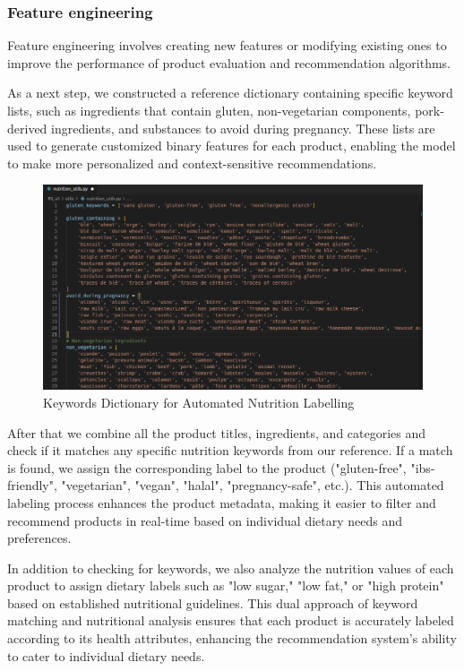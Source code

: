 \subsubsection{Feature engineering}
\par Feature engineering involves creating new features or modifying existing
ones to improve the performance of product evaluation and recommendation algorithms.

\par As a next step, we constructed a reference dictionary containing specific
keyword lists, such as ingredients that contain gluten, non-vegetarian
components, pork-derived ingredients, and substances to avoid during
pregnancy. These lists are used to generate customized binary features
for each product, enabling the model to make more personalized and
context-sensitive recommendations.

\begin{center}
\begin{figure}[H]
    \includegraphics[scale=0.45]{images/nutrition_utils.png}
    \caption{Keywords Dictionary for Automated Nutrition Labelling} 
    \label{fig:nutrition_utils_file}
\end{figure}
\end{center}

After that we combine all the product titles, ingredients, and categories and check if it matches any specific nutrition keywords from our reference. 
If a match is found, we assign the corresponding label to the product ("gluten-free", "ibs-friendly", "vegetarian", "vegan", "halal", "pregnancy-safe", etc.). 
This automated labeling process enhances the product metadata, making it easier to filter and recommend products in real-time based on individual dietary needs and preferences.

\par In addition to checking for keywords, we also analyze the nutrition values of each product to assign dietary labels such as "low sugar," "low fat," or "high protein" based on established nutritional guidelines. 
This dual approach of keyword matching and nutritional analysis ensures that each product is accurately labeled according to its health attributes, enhancing the recommendation system's ability to cater to individual dietary needs.

